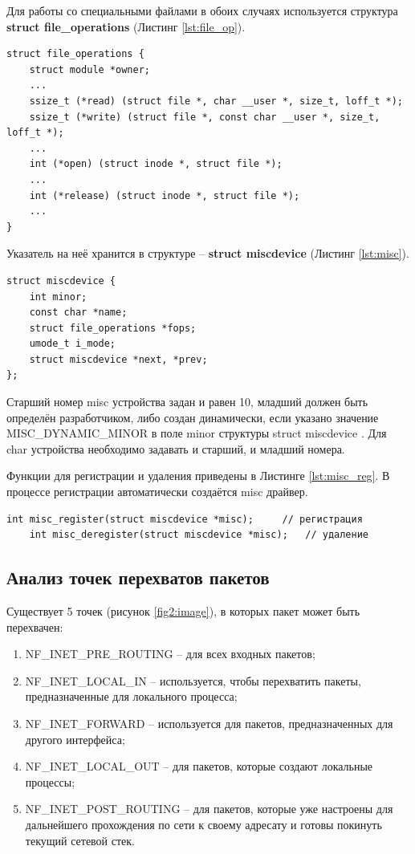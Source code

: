 Для работы со специальными файлами в обоих случаях используется структура \textbf{struct file\_operations} (Листинг \ref{lst:file_op}). 
\begin{lstlisting}[caption = {struct file\_operations}, label=lst:file_op]
struct file_operations {
	struct module *owner;
	...
	ssize_t (*read) (struct file *, char __user *, size_t, loff_t *);
	ssize_t (*write) (struct file *, const char __user *, size_t, loff_t *);
	...
	int (*open) (struct inode *, struct file *);
	...
	int (*release) (struct inode *, struct file *);
	...
}
\end{lstlisting}

Указатель на неё хранится в структуре -- \textbf{struct miscdevice} (Листинг \ref{lst:misc}).
\begin{lstlisting}[caption = {struct miscdevice}, label=lst:misc]
struct miscdevice {
	int minor;
	const char *name;
	struct file_operations *fops;
	umode_t i_mode;
	struct miscdevice *next, *prev;
};
\end{lstlisting}

Старший номер misc устройства задан и равен 10, младший должен быть определён разработчиком, либо создан динамически, если указано значение MISC\_DYNAMIC\_MINOR в поле minor структуры struct miscdevice \cite{3d}. Для char устройства необходимо задавать и старший, и младший номера.

Функции для регистрации и удаления приведены в Листинге \ref{lst:misc_reg}. В процессе регистрации автоматически создаётся misc драйвер.

\begin{lstlisting}[caption = {Функции для регистрации и удаления misc устройства}, label=lst:misc_reg]
	int misc_register(struct miscdevice *misc);		// регистрация
	int misc_deregister(struct miscdevice *misc);	// удаление
\end{lstlisting}

\subsection{Анализ точек перехватов пакетов}
Существует 5 точек (рисунок \ref{fig2:image}), в которых пакет может быть перехвачен:
\begin{enumerate}
	\item NF\_INET\_PRE\_ROUTING – для всех входных пакетов;
	\item NF\_INET\_LOCAL\_IN – используется, чтобы перехватить пакеты, предназначенные для локального процесса;
	\item NF\_INET\_FORWARD – используется для пакетов, предназначенных для другого интерфейса;
	\item NF\_INET\_LOCAL\_OUT – для пакетов, которые создают локальные процессы;
	\item NF\_INET\_POST\_ROUTING – для пакетов, которые уже настроены для дальнейшего прохождения по сети к своему адресату и готовы покинуть текущий сетевой стек.
\end{enumerate}

